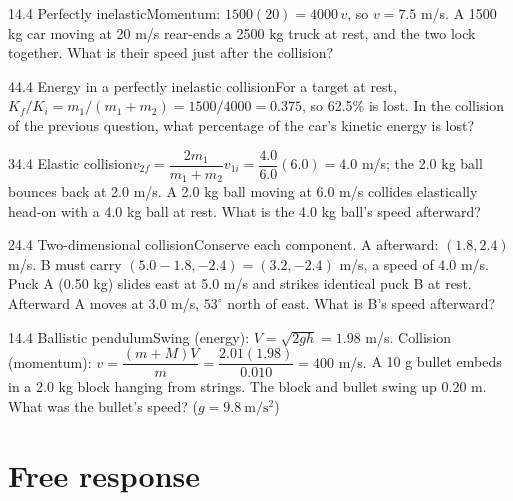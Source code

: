 \documentclass[11pt]{article}
\begin{document}
\begin{q}{1}{4.4 Perfectly inelastic}{Momentum: $1500(20) = 4000\,v$, so $v = 7.5$ m/s.}
A 1500 kg car moving at 20 m/s rear-ends a 2500 kg truck at rest, and the two lock together. What is their speed just after the collision?
\end{q}
\begin{q}{4}{4.4 Energy in a perfectly inelastic collision}{For a target at rest, $K_f/K_i = m_1/(m_1 + m_2) = 1500/4000 = 0.375$, so 62.5\% is lost.}
In the collision of the previous question, what percentage of the car's kinetic energy is lost?
\end{q}
\begin{q}{3}{4.4 Elastic collision}{$v_{2f} = \dfrac{2m_1}{m_1 + m_2}v_{1i} = \dfrac{4.0}{6.0}(6.0) = 4.0$ m/s; the 2.0 kg ball bounces back at 2.0 m/s.}
A 2.0 kg ball moving at 6.0 m/s collides elastically head-on with a 4.0 kg ball at rest. What is the 4.0 kg ball's speed afterward?
\end{q}
\begin{q}{2}{4.4 Two-dimensional collision}{Conserve each component. A afterward: $(1.8, 2.4)$ m/s. B must carry $(5.0 - 1.8, -2.4) = (3.2, -2.4)$ m/s, a speed of 4.0 m/s.}
Puck A (0.50 kg) slides east at 5.0 m/s and strikes identical puck B at rest. Afterward A moves at 3.0 m/s, $53^\circ$ north of east. What is B's speed afterward?
\end{q}
\begin{q}{1}{4.4 Ballistic pendulum}{Swing (energy): $V = \sqrt{2gh} = 1.98$ m/s. Collision (momentum): $v = \dfrac{(m + M)V}{m} = \dfrac{2.01(1.98)}{0.010} = 400$ m/s.}
A 10 g bullet embeds in a 2.0 kg block hanging from strings. The block and bullet swing up 0.20 m. What was the bullet's speed? ($g = 9.8\ \mathrm{m/s^2}$)
\end{q}

\section{Free response}
\end{document}
